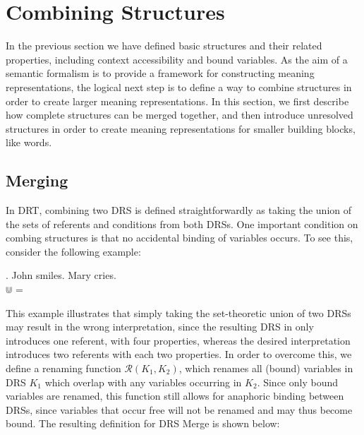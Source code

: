 \section{Combining Structures}\label{sec:combining}

In the previous section we have defined basic structures and their related
properties, including context accessibility and bound variables.  As the aim
of a semantic formalism is to provide a framework for constructing meaning
representations, the logical next step is to define a way to combine
structures in order to create larger meaning representations. In this
section, we first describe how complete structures can be merged together,
and then introduce unresolved structures in order to create meaning
representations for smaller building blocks, like words.

\subsection{Merging}

In DRT, combining two DRS is defined straightforwardly as taking the union
of the sets of referents and conditions from both DRSs. One important
condition on combing structures is that no accidental binding of variables
occurs. To see this, consider the following example:

\ex. John smiles. Mary cries.\\
   $\Cup$  = 

\noindent This example illustrates that simply taking the set-theoretic
union of two DRSs may result in the wrong interpretation, since the
resulting DRS in \Last only introduces one referent, with four properties,
whereas the desired interpretation introduces two referents with each two
properties. In order to overcome this, we define a renaming function
$\mathcal{R}(K_1,K_2)$, which renames all (bound) variables in DRS $K_1$
which overlap with any variables occurring in $K_2$. %
Since only bound variables are renamed, this function still allows for
anaphoric binding between DRSs, since variables that occur free will not be
renamed and may thus become bound. The resulting definition for DRS Merge is
shown below:

